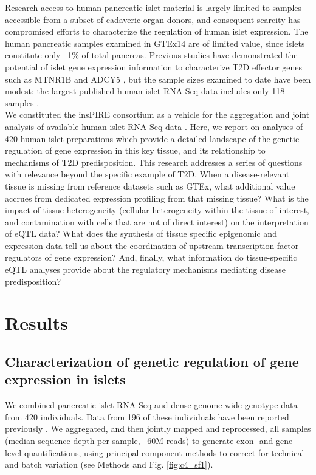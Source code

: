 Research access to human pancreatic islet material is largely limited to samples accessible from a subset of cadaveric organ donors, and consequent scarcity has compromised efforts to characterize the regulation of human islet expression. The human pancreatic samples examined in GTEx14 are of limited value, since islets constitute only ~1\% of total pancreas. Previous studies have demonstrated the potential of islet gene expression information to characterize T2D effector genes such as MTNR1B and ADCY5 \cite{varshneyGeneticRegulatorySignatures2017, fadistaGlobalGenomicTranscriptomic2014, buntTranscriptExpressionData2015}, but the sample sizes examined to date have been modest: the largest published human islet RNA-Seq data includes only 118 samples \cite{buntTranscriptExpressionData2015}. \\
    
We constituted the \ac{insPIRE} consortium as a vehicle for the aggregation and joint analysis of available human islet RNA-Seq data \cite{varshneyGeneticRegulatorySignatures2017, fadistaGlobalGenomicTranscriptomic2014, buntTranscriptExpressionData2015}. Here, we report on analyses of 420 human islet preparations which provide a detailed landscape of the genetic regulation of gene expression in this key tissue, and its relationship to mechanisms of T2D predisposition.
This research addresses a series of questions with relevance beyond the specific example of T2D. When a disease-relevant tissue is missing from reference datasets such as GTEx, what additional value accrues from dedicated expression profiling from that missing tissue? What is the impact of tissue heterogeneity (cellular heterogeneity within the tissue of interest, and contamination with cells that are not of direct interest) on the interpretation of eQTL data? What does the synthesis of tissue specific epigenomic and expression data tell us about the coordination of upstream transcription factor regulators of gene expression? And, finally, what information do tissue-specific eQTL analyses provide about the regulatory mechanisms mediating disease predisposition? 

\section{Results}
   
\subsection{Characterization of genetic regulation of gene expression in islets}
We combined pancreatic islet RNA-Seq and dense genome-wide genotype data from 420 individuals. Data from 196 of these individuals have been reported previously \cite{varshneyGeneticRegulatorySignatures2017, fadistaGlobalGenomicTranscriptomic2014, buntTranscriptExpressionData2015}. We aggregated, and then jointly mapped and reprocessed, all samples (median sequence-depth per sample, ~60M reads) to generate exon- and gene-level quantifications, using principal component methods to correct for technical and batch variation (see Methods and Fig. \ref{fig:c4_sf1}). \\

